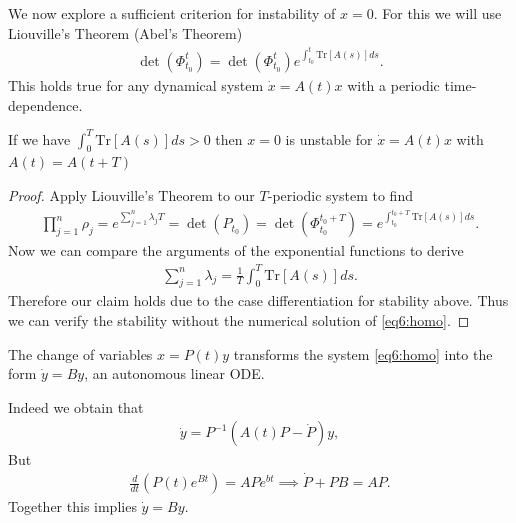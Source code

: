 We now explore a sufficient criterion for instability of $x=0$. For this we will use Liouville's Theorem (Abel's Theorem)
\begin{align}
	\boxed{
		\det (\Phi_{t_0}^{t}) = \det(\Phi_{t_0}^{t})e^{\int_{t_0}^{t}  \textrm{Tr} \left[ A(s) \right] ds}.
	}
\end{align}
This holds true for any dynamical system $\dot{x}=A(t)x$ with a periodic time-dependence.
\begin{proposition}
	If we have $\int_{0}^{T}  \textrm{Tr} [A(s)]ds>0$ then $x=0$ is unstable for $\dot{x}=A(t)x$ with $A(t) = A(t+T)$
\end{proposition}
\begin{proof}
Apply Liouville's Theorem to our $T$-periodic system to find
\begin{align}
	\prod_{j=1}^{n} \rho_j = e^{\sum_{j=1}^{n} \lambda_j T} = \det(P_{t_0})	= \det(\Phi_{t_0}^{t_0+T}) = e^{\int_{t_0}^{t_0+T}  \textrm{Tr} \left[ A(s) \right] ds}.	
\end{align}
Now we can compare the arguments of the exponential functions to derive
\begin{align}
	\boxed{
		\sum_{j=1}^{n} \lambda _j = \frac{1}{T} \int_{0}^{T}  \textrm{Tr} \left[A(s) \right] ds.
	}
\end{align}
Therefore our claim holds due to the case differentiation for stability above.  Thus we can verify the stability without the numerical solution of \eqref{eq6:homo}.
\end{proof}
\begin{remark}[]
	The change of variables $x = P(t)y$ transforms the system \eqref{eq6:homo} into the form $\dot{y}=By$, an autonomous linear ODE.
	
	Indeed we obtain that
	\begin{align}
		\dot{y} = P^{-1} (A(t)P - \dot{P})y,
	\end{align}
But
\begin{align}
	\frac{d}{dt}\left( P(t)e^{Bt}\right) = APe^{bt} \implies \dot{P} + PB = AP.
\end{align}
Together this implies $\dot{y} = By$.
\end{remark}
